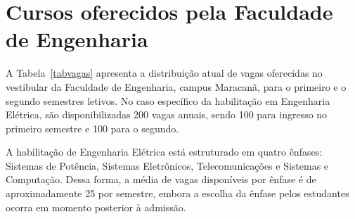 \section{Cursos oferecidos pela Faculdade de Engenharia}

A Tabela~\ref{tabvagas} apresenta a distribuição atual de vagas oferecidas no vestibular da Faculdade de Engenharia, campus Maracanã, para o primeiro e o segundo semestres letivos. No caso específico da habilitação em Engenharia Elétrica, são disponibilizadas 200 vagas anuais, sendo 100 para ingresso no primeiro semestre e 100 para o segundo.

A habilitação de Engenharia Elétrica está estruturado em quatro ênfases: Sistemas de Potência, Sistemas Eletrônicos, Telecomunicações e Sistemas e Computação. Dessa forma, a média de vagas disponíveis por ênfase é de aproximadamente 25 por semestre, embora a escolha da ênfase pelos estudantes ocorra em momento posterior à admissão.

